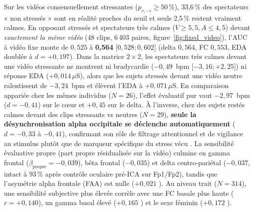 \documentclass[10pt]{article}
\begin{document}
Sur les vidéos consensuellement stressantes ($p_{v,-i} \ge 50\,\%$), 33,6\,\% des spectateurs « non stressés » sont en réalité proches du seuil et seuls 2,5\,\% restent vraiment calmes. En opposant stressés et spectateurs très calmes ($V \ge 5{,}5, A \le 4{,}5$) devant \emph{exactement la même vidéo} (48 clips, 6\,403 paires, figure~\ref{fig:fixed_video}), l'AUC à vidéo fixe monte de $0{,}525$ à \textbf{0,564} [$0{,}528 ; 0{,}602$] (delta $0{,}564$, FC $0{,}553$, EDA doublée à $d = +0{,}197$). Dans la matrice $2 \times 2$, les spectateurs très calmes devant une vidéo stressante ne montrent ni bradycardie ($-0{,}49$~bpm [$-3{,}16 ; +2{,}25$]) ni réponse EDA ($+0{,}014\,\mu$S), alors que les sujets stressés devant une vidéo neutre ralentissent de $-3{,}24$~bpm et élèvent l'EDA à $+0{,}071\,\mu$S. En comparaison appariée chez les mêmes individus ($N = 26$), l'effet évaluatif pur vaut $-2{,}97$~bpm ($d = -0{,}41$) sur le cœur et $+0{,}45$ sur le delta. À l'inverse, chez des sujets restés calmes devant des clips stressants vs neutres ($N = 29$), \textbf{seule la désynchronisation alpha occipitale se déclenche automatiquement} ($d = -0{,}33$ à $-0{,}41$), confirmant son rôle de filtrage attentionnel et de vigilance au stimulus plutôt que de marqueur spécifique du stress vécu \cite{zumer2014,panitz2019,bacigalupo2022,codispoti2023,stegmann2024,simons2009,kim2021,romeo2022}. La sensibilité évaluative propre (part propre résidualisée sur la vidéo) culmine en gamma frontal ($\beta_{\text{propre}} = -0{,}039$), bêta frontal ($-0{,}035$) et delta centro-pariétal ($-0{,}037$, intact à 93\,\% après contrôle oculaire pré-ICA sur Fp1/Fp2), tandis que l'asymétrie alpha frontale (FAA) est nulle ($+0{,}021$ \cite{vandervinne2017}). Au niveau trait ($N = 314$), une sensibilité subjective plus élevée corrèle avec une FC basale plus haute ($r = +0{,}140$), un gamma basal élevé ($+0{,}165$ \cite{oathes2008}) et le sexe féminin ($+0{,}172$ \cite{bradley2001}).
\end{document}
